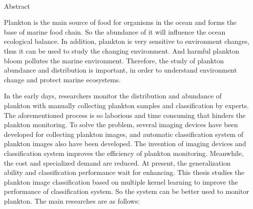\newpage

\begin{center}
  {\sanhao[1.5]\heiti\oucetitle\\\vskip7pt Abstract}
\end{center}
{\normalsize\songti

   Plankton is the main source of food for organisms in the ocean and forms the base of marine food chain. So the abundance of it will influence the ocean ecological balance. In addition, plankton is very sensitive to environment changes, thus it can be used to study the changing environment. And harmful plankton bloom pollutes the marine environment. Therefore, the study of plankton abundance and distribution is important, in order to understand environment change and protect marine ecosystems. 

   In the early days, researchers monitor the distribution and abundance of plankton with manually collecting plankton samples and classification by experts. The aforementioned process is so laborious and time consuming that hinders the plankton monitoring. To solve the problem, several imaging devices have been developed for collecting plankton images, and automatic classification system of plankton images also have been developed. The invention of imaging devices and classification system improves the efficiency of plankton monitoring. Meanwhile, the cost and specialized demand are reduced. At present, the generalization ability and classification performance wait for enhancing. This thesis studies the plankton image classification based on multiple kernel learning to improve the performance of classification system. So the system can be better used to monitor plankton. The main researches are as follows:

}
